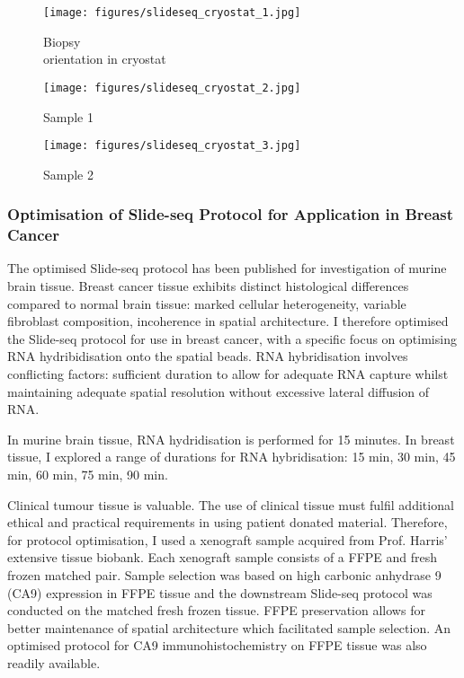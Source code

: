\begin{figure}[!htb]
		\left
		\texttt{[image: figures/slideseq\_cryostat\_1.jpg]} \hfill
		\caption[Biopsy orientation in cryostat]{Biopsy \\ orientation in cryostat}
		\label{fig:slideseq_cryostat_1}
	\endminipage\hfill
		\centering
		\texttt{[image: figures/slideseq\_cryostat\_2.jpg]} \hfill
		\caption[Sample 1]{Sample 1}
		\label{fig:slideseq_cryostat_2}
	\endminipage\hfill
		\centering
		\texttt{[image: figures/slideseq\_cryostat\_3.jpg]} \hfill
		\caption[Sample 2]{Sample 2}
		\label{fig:slideseq_cryostat_3}
	\endminipage
\end{figure}




\subsubsection{Optimisation of Slide-seq Protocol for Application in Breast Cancer}
The optimised Slide-seq protocol has been published for investigation of murine brain tissue. Breast cancer tissue exhibits distinct histological differences compared to normal brain tissue: marked cellular heterogeneity, variable fibroblast composition, incoherence in spatial architecture. I therefore optimised the Slide-seq protocol for use in breast cancer, with a specific focus on optimising RNA hydribidisation onto the spatial beads. RNA hybridisation involves conflicting factors: sufficient duration to allow for adequate RNA capture whilst maintaining adequate spatial resolution without excessive lateral diffusion of RNA.

In murine brain tissue, RNA hydridisation is performed for 15 minutes. In breast tissue, I explored a range of durations for RNA hybridisation: 15 min, 30 min, 45 min, 60 min, 75 min, 90 min.

Clinical tumour tissue is valuable. The use of clinical tissue must fulfil additional ethical and practical requirements in using patient donated material. Therefore, for protocol optimisation, I used a xenograft sample acquired from Prof. Harris' extensive tissue biobank. Each xenograft sample consists of a FFPE and fresh frozen matched pair. Sample selection was based on high carbonic anhydrase 9 (CA9) expression in FFPE tissue and the downstream Slide-seq protocol was conducted on the matched fresh frozen tissue. FFPE preservation allows for better maintenance of spatial architecture which facilitated sample selection. An optimised protocol for CA9 immunohistochemistry on FFPE tissue was also readily available.

